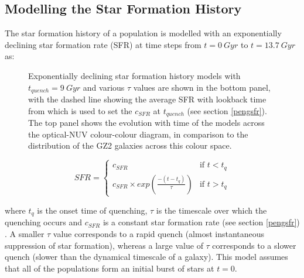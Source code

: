 \documentclass{mn2e}
\begin{document}
\subsection{Modelling the Star Formation History}\label{sfh}
The star formation history of a population is modelled with an exponentially declining star formation rate (SFR) at time steps from $t =0 ~Gyr$ to $t=13.7 ~Gyr$ as:

\begin{figure}
\caption{Exponentially declining star formation history models with $t_{quench}=9~Gyr$ and various $\tau$ values are shown in the bottom panel, with the dashed line showing the average SFR with lookback time from \cite{Peng} which is used to set the $c_{SFR}$ at $t_{quench}$ (see section \ref{pengsfr}). The top panel shows the evolution with time of the models across the optical-NUV colour-colour diagram, in comparison to the distribution of the GZ2 galaxies across this colour space.}
\label{kev}
\end{figure}


\[
SFR = 
\begin{cases}
c_{SFR} & \text{if } t < t_{q} \\
c_{SFR} \times exp{\left( \frac{-(t-t_{q})}{\tau}\right)} & \text{if } t > t_{q}
\end{cases}
\]

where $t_{q}$ is the onset time of quenching, $\tau$ is the timescale over which the quenching occurs and $c_{SFR}$ is a constant star formation rate (see section \ref{pengsfr}) . A smaller $\tau$ value corresponds to a rapid quench (almost instantaneous suppression of star formation), whereas a large value of $\tau$ corresponds to a slower quench (slower than the dynamical timescale of a galaxy).  This model assumes that all of the populations form an initial burst of stars at $t=0$. %
\end{document}
